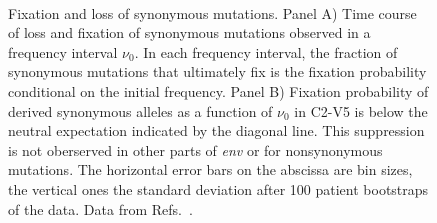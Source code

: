\documentclass[rmp, twocolumn]{revtex4}
\begin{document}
\begin{figure}
\begin{center}
\\
\caption{Fixation and loss of synonymous mutations.
Panel A) Time
course of loss and fixation of synonymous mutations observed in a frequency interval $\nu_0$. 
In each frequency interval, the  fraction of synonymous
mutations that ultimately fix is the fixation probability conditional on the
initial frequency.
Panel B) Fixation probability of derived synonymous
alleles as a function of $\nu_0$ in C2-V5 is below the neutral
expectation indicated by the diagonal line. This suppression is not
oberserved in other parts of {\it env} or for nonsynonymous mutations.
The horizontal error bars on the abscissa are bin sizes, the vertical ones the
standard deviation after 100 patient bootstraps of the data. Data from
Refs.~\cite{shankarappa_consistent_1999, bunnik_autologous_2008}.}
\label{fig:fixp}
\end{center}
\end{figure}
\end{document}
